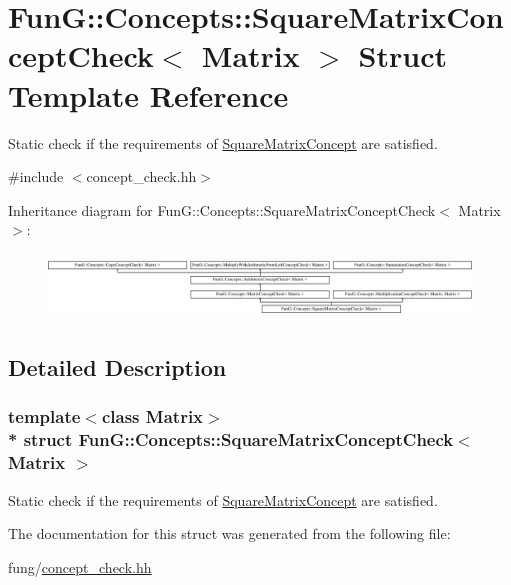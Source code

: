 \hypertarget{structFunG_1_1Concepts_1_1SquareMatrixConceptCheck}{}\section{FunG\+:\+:Concepts\+:\+:Square\+Matrix\+Concept\+Check$<$ Matrix $>$ Struct Template Reference}
\label{structFunG_1_1Concepts_1_1SquareMatrixConceptCheck}


Static check if the requirements of \hyperlink{structFunG_1_1Concepts_1_1SquareMatrixConcept}{Square\+Matrix\+Concept} are satisfied.  




{\ttfamily \#include $<$concept\+\_\+check.\+hh$>$}

Inheritance diagram for FunG\+:\+:Concepts\+:\+:Square\+Matrix\+Concept\+Check$<$ Matrix $>$\+:\begin{figure}[H]
\begin{center}
\leavevmode
\includegraphics[height=1.728395cm]{structFunG_1_1Concepts_1_1SquareMatrixConceptCheck}
\end{center}
\end{figure}


\subsection{Detailed Description}
\subsubsection*{template$<$class Matrix$>$\\*
struct Fun\+G\+::\+Concepts\+::\+Square\+Matrix\+Concept\+Check$<$ Matrix $>$}

Static check if the requirements of \hyperlink{structFunG_1_1Concepts_1_1SquareMatrixConcept}{Square\+Matrix\+Concept} are satisfied. 

The documentation for this struct was generated from the following file\+:\begin{DoxyCompactItemize}
\item 
fung/\hyperlink{concept__check_8hh}{concept\+\_\+check.\+hh}\end{DoxyCompactItemize}
